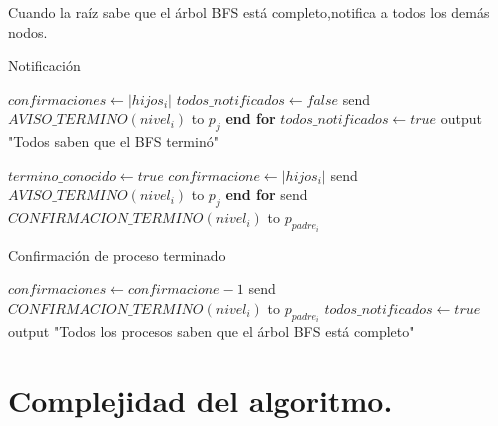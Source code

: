 \documentclass[12pt]{article}
\begin{document}
\noindent Cuando la raíz sabe que el árbol BFS está completo,notifica a todos los demás nodos.

\begin{algorithm}
\caption{Notificación}
\begin{algorithmic}[1]
    \State $confirmaciones \gets |hijos_i|$
    \State $todos\_notificados \gets false$
        \State send $AVISO\_TERMINO(nivel_i)$ to $p_j$
    \State \textbf{end for}
        \State $todos\_notificados \gets true$
        \State output "Todos saben que el BFS terminó"
    \EndIf
\EndProcedure

        \State $termino\_conocido \gets true$
        \State $confirmacione \gets |hijos_i|$
            \State send $AVISO\_TERMINO(nivel_i)$ to $p_j$
        \State \textbf{end for}
            \State send $CONFIRMACION\_TERMINO(nivel_i)$ to $p_{padre_i}$
        \EndIf
    \EndIf
\EndWhen
\end{algorithmic}
\end{algorithm}

\begin{algorithm}[H]
\caption{Confirmación de proceso terminado}
\begin{algorithmic}[1]
        \State $confirmaciones \gets confirmacione - 1$
                \State send $CONFIRMACION\_TERMINO(nivel_i)$ to $p_{padre_i}$
            \Else
                \State $todos\_notificados \gets true$
                \State output "Todos los procesos saben que el árbol BFS está completo"
            \EndIf
        \EndIf
    \EndIf
\EndWhen
\end{algorithmic}
\end{algorithm}


\section{Complejidad del algoritmo.}
 
\end{document}
